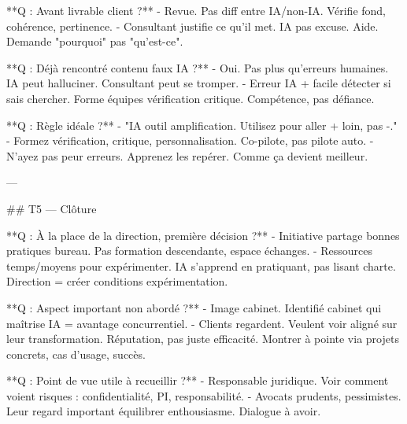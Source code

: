 **Q : Avant livrable client ?**
- Revue. Pas diff entre IA/non-IA. Vérifie fond, cohérence, pertinence.
- Consultant justifie ce qu'il met. IA pas excuse. Aide. Demande "pourquoi" pas "qu'est-ce".

**Q : Déjà rencontré contenu faux IA ?**
- Oui. Pas plus qu'erreurs humaines. IA peut halluciner. Consultant peut se tromper.
- Erreur IA + facile détecter si sais chercher. Forme équipes vérification critique. Compétence, pas défiance.

**Q : Règle idéale ?**
- "IA outil amplification. Utilisez pour aller + loin, pas -."
- Formez vérification, critique, personnalisation. Co-pilote, pas pilote auto.
- N'ayez pas peur erreurs. Apprenez les repérer. Comme ça devient meilleur.

---

## T5 — Clôture

**Q : À la place de la direction, première décision ?**
- Initiative partage bonnes pratiques bureau. Pas formation descendante, espace échanges.
- Ressources temps/moyens pour expérimenter. IA s'apprend en pratiquant, pas lisant charte. Direction = créer conditions expérimentation.

**Q : Aspect important non abordé ?**
- Image cabinet. Identifié cabinet qui maîtrise IA = avantage concurrentiel.
- Clients regardent. Veulent voir aligné sur leur transformation. Réputation, pas juste efficacité. Montrer à pointe via projets concrets, cas d'usage, succès.

**Q : Point de vue utile à recueillir ?**
- Responsable juridique. Voir comment voient risques : confidentialité, PI, responsabilité.
- Avocats prudents, pessimistes. Leur regard important équilibrer enthousiasme. Dialogue à avoir.